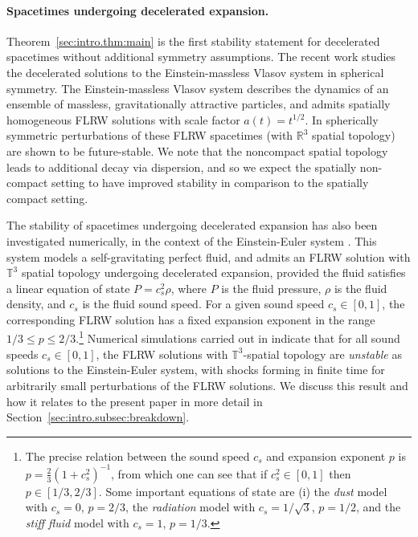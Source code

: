 \documentclass{article}
\newcommand{\RR}{\mathbb{R}}
\newcommand{\TT}{\mathbb{T}}
\begin{document}
\paragraph{Spacetimes undergoing decelerated expansion.}
Theorem~\ref{sec:intro.thm:main} is the first stability statement for decelerated spacetimes without additional symmetry assumptions. The recent work \cite{Tay:decelFLRWstab:24} studies the decelerated solutions to the Einstein-massless Vlasov system in spherical symmetry. The Einstein-massless Vlasov system describes the dynamics of an ensemble of massless, gravitationally attractive particles, and admits spatially homogeneous FLRW solutions with scale factor $a(t) = t^{1/2}$. In \cite{Tay:decelFLRWstab:24} spherically symmetric perturbations of these FLRW spacetimes (with $\RR^3$ spatial topology) are shown to be future-stable. We note that the noncompact spatial topology leads to additional decay via dispersion, and so we expect the spatially non-compact setting to have improved stability in comparison to the spatially compact setting. 

The stability of spacetimes undergoing decelerated expansion has also been investigated numerically, in the context of the Einstein-Euler system \cite{Mar:instabilityFLRW:25}. This system models a self-gravitating perfect fluid, and admits an FLRW solution with $\TT^3$ spatial topology undergoing decelerated expansion, provided the fluid satisfies a linear equation of state $P = c_s^2\rho$, where $P$ is the fluid pressure, $\rho$ is the fluid density, and $c_s$ is the fluid sound speed. For a given sound speed $c_s \in [0,1]$, the corresponding FLRW solution has a fixed expansion exponent in the range $1/3 \leq p \leq 2/3$.\footnote{The precise relation between the sound speed $c_s$ and expansion exponent $p$ is $p = \frac{2}{3}(1+c_s^2)^{-1}$, from which one can see that if $c_s^2 \in [0,1]$ then $p \in [1/3,2/3]$. Some important equations of state are (i) the \emph{dust} model with $c_s = 0$, $p = 2/3$, the \emph{radiation} model with $c_s=1/\sqrt{3}$, $p=1/2$, and the \emph{stiff fluid} model with $c_s=1$, $p=1/3$.} Numerical simulations carried out in \cite{Mar:instabilityFLRW:25} indicate that for all sound speeds $c_s \in [0,1]$, the FLRW solutions with $\TT^3$-spatial topology are \emph{unstable} as solutions to the Einstein-Euler system, with shocks forming in finite time for arbitrarily small perturbations of the FLRW solutions. We discuss this result and how it relates to the present paper in more detail in Section~\ref{sec:intro.subsec:breakdown}.
\end{document}
